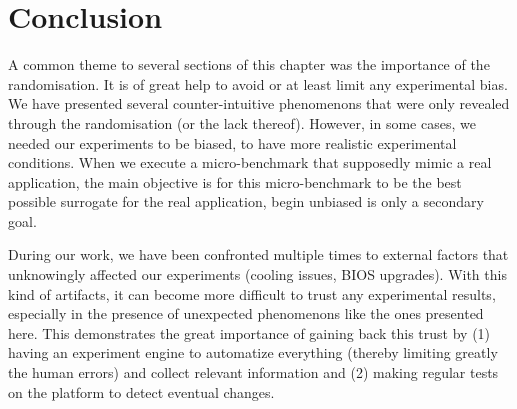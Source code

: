 	\section{Conclusion}
        A common theme to several sections of this chapter was the importance of the randomisation. It is of great help
        to avoid or at least limit any experimental bias. We have presented several counter-intuitive phenomenons that
        were only revealed through the randomisation (or the lack thereof). However, in some cases, we needed our
        experiments to be biased, to have more realistic experimental conditions. When we execute a micro-benchmark that
        supposedly mimic a real application, the main objective is for this micro-benchmark to be the best possible
        surrogate for the real application, begin unbiased is only a secondary goal.

        During our work, we have been confronted multiple times to external factors that unknowingly affected our
        experiments (\eg cooling issues, BIOS upgrades). With this kind of artifacts, it can become more difficult to
        trust any experimental results, especially in the presence of unexpected phenomenons like the ones presented
        here. This demonstrates the great importance of gaining back this trust by (1) having an experiment engine to
        automatize everything (thereby limiting greatly the human errors) and collect relevant information and (2)
        making regular tests on the platform to detect eventual changes.

